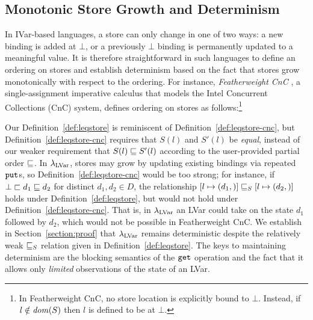 \subsection{Monotonic Store Growth and Determinism}\label{subsection:monotonicity}

In IVar-based languages, a store can only change
in one of two ways: a new binding is added at $\bot$, or a
previously $\bot$ binding is permanently updated to a meaningful value.
It is therefore straightforward in such languages
to define an ordering on stores and establish determinism based on the
fact that stores grow monotonically with respect to the ordering. For
instance, \emph{Featherweight CnC} \cite{CnC}, a single-assignment 
imperative calculus that models the Intel Concurrent Collections (CnC)
system, defines ordering on stores as follows:\footnote{In
  Featherweight CnC, 
  no store location is explicitly bound to $\bot$.
  Instead, if $l \notin \mathit{dom}(S)$ then $l$ is defined to be at
  $\bot$. %
}

\DefLeqStoreCnC

\noindent 
Our Definition~\ref{def:leqstore} is reminiscent of
Definition~\ref{def:leqstore-cnc}, but Definition~\ref{def:leqstore-cnc}
requires that $S(l)$ and $S'(l)$
be \emph{equal}, instead of our weaker
requirement that $S(l) \sqsubseteq S'(l)$ according to the user-provided
partial order $\sqsubseteq$.  In $\lambda_{\textrm{LVar}}$, stores may grow by updating
existing bindings via repeated $\mbox{\texttt{put}}$s, so
Definition~\ref{def:leqstore-cnc} would be too strong; for instance,
if $\bot \sqsubset d_1 \sqsubseteq d_2$ for distinct $d_1, d_2 \in D$, the relationship
$\left[ l \mapsto (d_1, \right)] \sqsubseteq_S \left[ l \mapsto (d_2, \right)]$
holds under Definition~\ref{def:leqstore}, but would not hold under
Definition~\ref{def:leqstore-cnc}.  That is, in $\lambda_{\textrm{LVar}}$ an LVar
could take on the state $d_1$ followed by $d_2$, which would not be
possible in Featherweight CnC.  We establish in
Section~\ref{section:proof} that $\lambda_{\textrm{LVar}}$ remains
deterministic despite the relatively weak $ \sqsubseteq_S $
relation given in Definition~\ref{def:leqstore}.  The keys to
maintaining determinism are the blocking semantics of the $\mbox{\texttt{get}}$
operation and the fact that it allows only \emph{limited} observations
of the state of an LVar.


